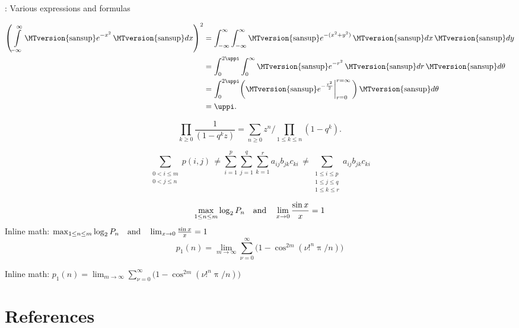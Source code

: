 \documentclass[aspectratio = 169, t, 10pt]{beamer}
\renewcommand{\mathrm}[1]{\textrm{\MTversion{sansup}\(#1\)}}%
\begin{document}
\begin{frame}[allowframebreaks]{\insertsection: Various expressions and formulas}
\framebreak

\begin{align*}
\begin{aligned}
\left( \int\limits_{-\infty}^\infty \mathrm{e}^{-x^2}\,\mathrm{d}x \right)^2
&=\int_{-\infty}^\infty\int_{-\infty}^\infty \mathrm{e}^{-(x^2+y^2)}\,\mathrm{d}x\,\mathrm{d}y\\
&=\int_0^{2\uppi}\int_0^\infty \mathrm{e}^{-r^2}\,\mathrm{d}r\,\mathrm{d}\theta\\
&=\int_0^{2\uppi}\biggl(\mathrm{e}^{-\frac{r^2}{2}}
\biggl|_{r=0}^{r=\infty}\,\biggr)\,\mathrm{d}\theta\\
&=\uppi.
\end{aligned}
\end{align*}

\framebreak

$$\prod_{k\ge0}\frac{1}{(1-q^kz)}=
\sum_{n\ge0}z^n\bigg/\!\!\prod_{1\le k\le n}(1-q^k).$$

$$\sum_{\substack{\scriptstyle 0< i\le m\\\scriptstyle0<j\le n}}p(i,j) \,\ne
%
%
\sum_{i=1}^p \sum_{j=1}^q \sum_{k=1}^r a_{ij} b_{jk} c_{ki} \,\ne
%
\sum_{\substack{\scriptstyle 1\le i\le p \\ \scriptstyle 1\le j\le q\\
		\scriptstyle 1\le k\le r}} a_{ij} b_{jk} c_{ki}$$

\framebreak

$$\max_{1\le n\le m}\log_2P_n \quad \hbox{and} \quad
\lim_{x\to0}\frac{\sin x}{x}=1$$
Inline math:
\hfill$\max_{1\le n\le m}\log_2P_n \quad \hbox{and} \quad
\lim_{x\to0}\frac{\sin x}{x}=1$\hfill\null
$$p_1(n)=\lim_{m\to\infty}\sum_{\nu=0}^\infty\bigl(1-\cos^{2m}(\nu!^n\uppi/n)\bigr)$$

\smallskip

Inline math:
\hfill$p_1(n)=\lim_{m\to\infty}\sum_{\nu=0}^\infty\bigl(1-\cos^{2m}(\nu!^n\uppi/n)\bigr)$\hfill\null

\end{frame}


\begingroup

\section{References}
\end{document}
